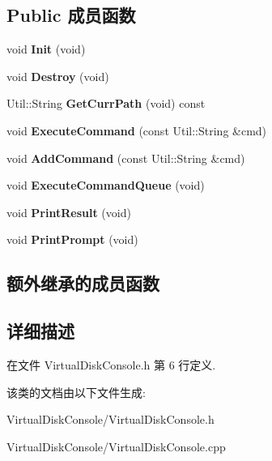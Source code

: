 \subsection*{Public 成员函数}
\begin{DoxyCompactItemize}
\item 
\hypertarget{class_virtual_disk_console_aa17d7576f37de378044f9f9c93151300}{void {\bfseries Init} (void)}\label{class_virtual_disk_console_aa17d7576f37de378044f9f9c93151300}

\item 
\hypertarget{class_virtual_disk_console_a96b0c1db50820d232752237bd88d39e0}{void {\bfseries Destroy} (void)}\label{class_virtual_disk_console_a96b0c1db50820d232752237bd88d39e0}

\item 
\hypertarget{class_virtual_disk_console_a95cf6318171081d914394091b115f312}{Util\-::\-String {\bfseries Get\-Curr\-Path} (void) const }\label{class_virtual_disk_console_a95cf6318171081d914394091b115f312}

\item 
\hypertarget{class_virtual_disk_console_ab5f63f91d39a6afc58f34e1688503900}{void {\bfseries Execute\-Command} (const Util\-::\-String \&cmd)}\label{class_virtual_disk_console_ab5f63f91d39a6afc58f34e1688503900}

\item 
\hypertarget{class_virtual_disk_console_a98be6e2fcf8d944977c099a785d884ba}{void {\bfseries Add\-Command} (const Util\-::\-String \&cmd)}\label{class_virtual_disk_console_a98be6e2fcf8d944977c099a785d884ba}

\item 
\hypertarget{class_virtual_disk_console_a63c06c93228aadc734e1370e8efdff37}{void {\bfseries Execute\-Command\-Queue} (void)}\label{class_virtual_disk_console_a63c06c93228aadc734e1370e8efdff37}

\item 
\hypertarget{class_virtual_disk_console_a803b3ac3e53b7f395b662532acb6e98a}{void {\bfseries Print\-Result} (void)}\label{class_virtual_disk_console_a803b3ac3e53b7f395b662532acb6e98a}

\item 
\hypertarget{class_virtual_disk_console_a96890fe0d8cc0176ba0c0558fe75988a}{void {\bfseries Print\-Prompt} (void)}\label{class_virtual_disk_console_a96890fe0d8cc0176ba0c0558fe75988a}

\end{DoxyCompactItemize}
\subsection*{额外继承的成员函数}


\subsection{详细描述}


在文件 Virtual\-Disk\-Console.\-h 第 6 行定义.



该类的文档由以下文件生成\-:\begin{DoxyCompactItemize}
\item 
Virtual\-Disk\-Console/Virtual\-Disk\-Console.\-h\item 
Virtual\-Disk\-Console/Virtual\-Disk\-Console.\-cpp\end{DoxyCompactItemize}
